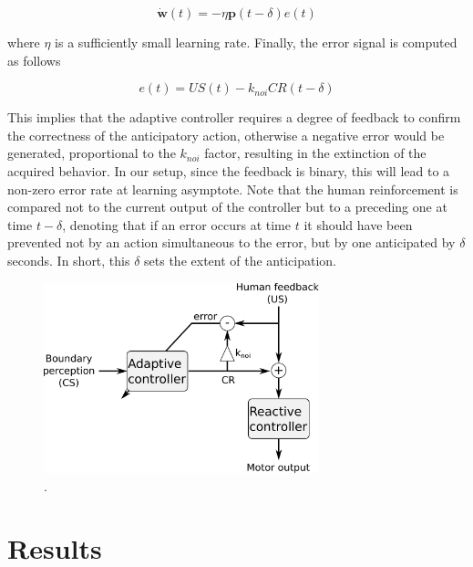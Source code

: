 \documentclass[letterpaper, 10 pt, conference]{ieeeconf}  %
\begin{document}
{\[
\dot{\mathbf{w}}(t) = -\eta \mathbf{p}(t-\delta) e(t)
\]

where $\eta$ is a sufficiently small learning rate. Finally, the error signal is computed as follows

\[
e(t) = US(t) - k_{noi} CR(t-\delta)
\]

This implies that the adaptive controller requires a degree of feedback to confirm the correctness of the anticipatory action, otherwise a negative error would be generated, proportional to the $k_{noi}$ factor, resulting in the extinction of the acquired behavior. In our setup, since the feedback is binary, this will lead to a non-zero error rate at learning asymptote. Note that the human reinforcement is compared not to the current output of the controller but to a preceding one at time $t-\delta$, denoting that if an error occurs at time $t$ it should have been prevented not by an action simultaneous to the error, but by one anticipated by $\delta$ seconds. In short, this $\delta$ sets the extent of the anticipation.

\begin{figure}[!t]
\centering
\includegraphics[width=8cm]{architecture}
\caption{.}
\label{fig:architecture}
\end{figure}




\section{Results}
\label{sec:results}

}
\end{document}
